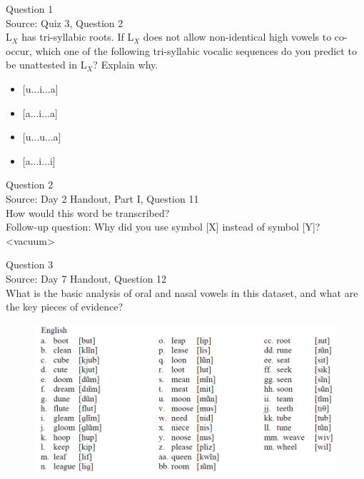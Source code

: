 \documentclass[12pt]{article}
\begin{document}
{\large Question 1}\\

Source: Quiz 3, Question 2\\

L$_X$ has tri-syllabic roots. If L$_X$ does not allow non-identical high vowels to co-occur, which one of the following tri-syllabic vocalic sequences do you predict to be unattested in L$_X$? Explain why.\\

\begin{itemize} \item {[u...i...a]} \item {[a...i...a]} \item {[u...u...a]} \item {[a...i...i]} \end{itemize}


\newpage

{\large Question 2}\\

Source: Day 2 Handout, Part I, Question 11\\

How would this word be transcribed?\\ Follow-up question: Why did you use symbol [X] instead of symbol [Y]?\\

<vacuum>


\newpage

{\large Question 3}\\

Source: Day 7 Handout, Question 12\\

What is the basic analysis of oral and nasal vowels in this dataset, and what are the key pieces of evidence?\\

\begin{figure}[H]
\includegraphics{../images/english12.png}
\end{figure}
\end{document}
